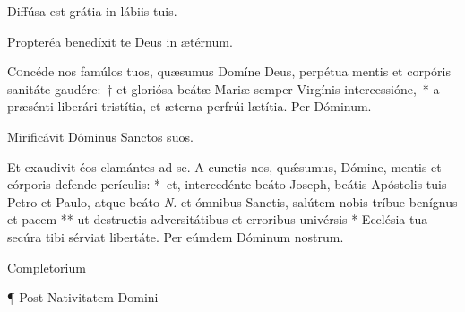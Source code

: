 \documentclass[vesperale_romanum.tex]{subfiles}
\begin{document}
\vv Diffúsa est grátia in lábiis tuis.

\rr Propteréa benedíxit te Deus in ætérnum.

\admagnificat

\label{an_beata_mater_in_sabbato_solesmes_1961}


\oratio \label{oratio_bmv}

\lettrine{C}{o}ncéde nos famúlos tuos, quæsumus Domíne Deus, perpétua mentis et corpóris sanitáte gaudére:~† et gloriósa beátæ Mariæ semper Virgínis intercessióne,~* a præsénti liberári tristítia, et æterna perfrúi lætítia. Per Dóminum.





\vv Mirificávit Dóminus Sanctos suos.

\rr Et exaudivit éos clamántes ad se.
%
\oratio
%
\lettrine{A}{} cun\-ctis nos, quǽsumus, Dómine, mentis et córporis defende perículis: \nolinebreak[4]*~et, intercedénte beáto Joseph, beátis Apóstolis tuis Petro et Paulo, atque beáto \textit{N.} et ómnibus Sanctis, salútem nobis tríbue benígnus et pacem ** ut destructis adversitátibus et erroribus univérsis * Ecclésia tua secúra tibi sérviat libertáte. Per eúmdem Dóminum nostrum.



Completorium  %


¶ Post Nativitatem Domini 
\end{document}
